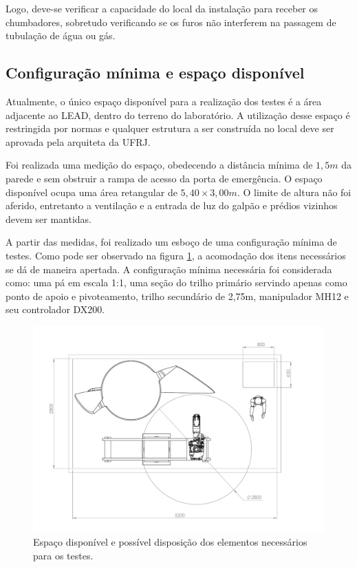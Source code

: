  Logo, deve-se verificar a capacidade do local da instalação para receber os
 chumbadores, sobretudo verificando se os furos não interferem na passagem de
 tubulação de água ou gás.
 
 \subsection{Configuração mínima e espaço disponível}

Atualmente, o único espaço disponível para a realização dos testes é a área
adjacente ao LEAD, dentro do terreno do laboratório.
A utilização desse espaço é restringida por normas e qualquer estrutura a ser
construída no local deve ser aprovada pela arquiteta da UFRJ. 

Foi realizada uma medição do espaço, obedecendo a distância mínima de $1,5m$
da parede e sem obstruir a rampa de acesso da porta de emergência. O espaço
disponível ocupa uma área retangular de $5,40\times3,00m$. O limite de altura
não foi aferido, entretanto a ventilação e a entrada de luz do galpão e prédios
vizinhos devem ser mantidas.

A partir das medidas, foi realizado um esboço de uma configuração
mínima de testes. Como pode ser observado na figura \ref{fig::planta}, a
acomodação dos itens necessários se dá de maneira apertada. A
configuração mínima necessária foi considerada como: uma pá em escala 1:1, uma
seção do trilho primário servindo apenas como ponto de apoio e pivoteamento,
trilho secundário de 2,75m, manipulador MH12 e seu controlador DX200.

\begin{figure}[h!]
\centering
	\includegraphics[width=0.9\columnwidth]{figs/espaco/Montagem_Base_LEAD}
	\caption{Espaço disponível e possível disposição dos elementos necessários
	para os testes.}
	\label{fig::planta}
\end{figure}


